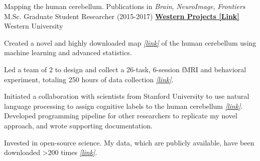 \begin{cventries}
  \cventry
    {Mapping the human cerebellum. Publications in \textit{Brain}, \textit{NeuroImage}, \textit{Frontiers}}
    {M.Sc. Graduate Student Researcher (2015-2017)} %
    {\href{https://github.com/maedbhk/}{\textbf{Western Projects [Link]}}}
    {Western University} %
    {
      \begin{cvitems} %
        \item {Created a novel and highly downloaded map {\href{http://www.diedrichsenlab.org/imaging/mdtb.htm}{\textit{[link]}}} of the human cerebellum using machine learning and advanced statistics.}
      	\item {Led a team of 2 to design and collect a 26-task, 6-session fMRI and behavioral experiment, totaling 250 hours of data collection {\href{http://www.diedrichsenlab.org/imaging/AtlasViewer/viewer.html}{\textit{[link]}}}.}
      	\item {Initiated a collaboration with scientists from Stanford University to use natural language processing to assign cognitive labels to the human cerebellum {\href{https://cognitiveatlas.org/}{\textit{[link]}}}. Developed programming pipeline for other researchers to replicate my novel approach, and wrote supporting documentation.}
      	\item {Invested in open-source science. My data, which are publicly available, have been downloaded >200 times {\href{https://openneuro.org/datasets/ds002105/versions/1.1.0}{\textit{[link]}}}.}
      \end{cvitems}
    }

\end{cventries}
